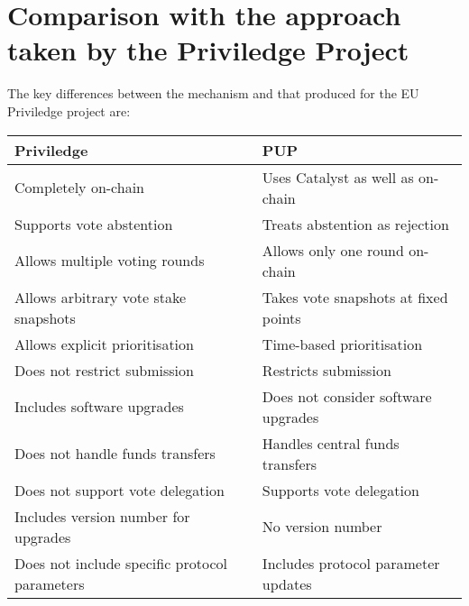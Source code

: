 \section{Comparison with the approach taken by the Priviledge Project}

The key differences between the mechanism and that produced for the EU Priviledge project are:

\begin{tabular}{||p{3in}|p{3in}||}
  \hline\hline
  \textbf{Priviledge} & \textbf{PUP}
  \\\hline
  Completely on-chain & Uses Catalyst as well as on-chain \\\hline
  Supports vote abstention & Treats abstention as rejection \\\hline
  Allows multiple voting rounds & Allows only one round on-chain \\\hline
  Allows arbitrary vote stake snapshots & Takes vote snapshots at fixed points \\\hline
  Allows explicit prioritisation & Time-based prioritisation \\\hline
  Does not restrict submission & Restricts submission \\\hline
  Includes software upgrades & Does not consider software upgrades \\\hline
  Does not handle funds transfers & Handles central funds transfers \\\hline
  Does not support vote delegation & Supports vote delegation \\\hline
  Includes version number for upgrades & No version number \\\hline
  Does not include specific protocol parameters & Includes protocol parameter updates \\\hline
  \hline
\end{tabular}

